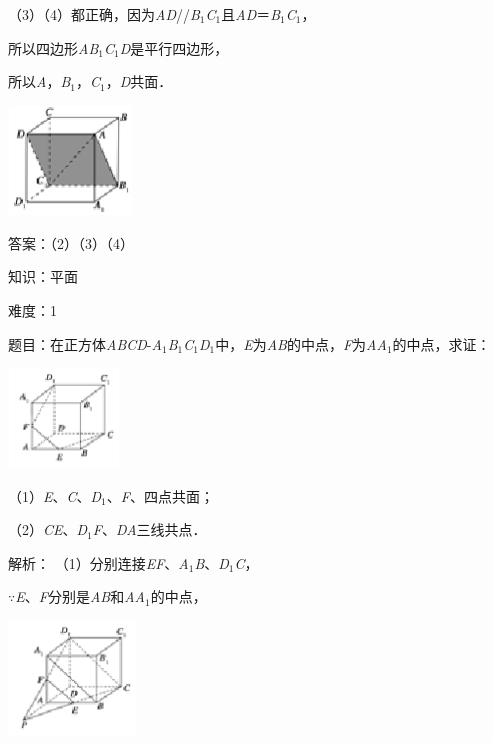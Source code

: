 \documentclass{article} %
\begin{document}
（3）（4）都正确，因为\textit{AD}//\textit{B}${}_{1}$\textit{C}${}_{1}$且\textit{AD}＝\textit{B}${}_{1}$\textit{C}${}_{1}$，

所以四边形\textit{AB}${}_{1}$\textit{C}${}_{1}$\textit{D}是平行四边形，

所以\textit{A}，\textit{B}${}_{1}$，\textit{C}${}_{1}$，\textit{D}共面．

\includegraphics*[width=1.30in, height=1.14in, keepaspectratio=false]{image90}

答案：（2）（3）（4）

知识：平面

难度：1

题目：在正方体\textit{ABCD}-\textit{A}${}_{1}$\textit{B}${}_{1}$\textit{C}${}_{1}$\textit{D}${}_{1}$中，\textit{E}为\textit{AB}的中点，\textit{F}为\textit{AA}${}_{1}$的中点，求证：



\includegraphics*[width=1.17in, height=1.04in, keepaspectratio=false]{image91}

（1）\textit{E}、\textit{C}、\textit{D}${}_{1}$、\textit{F}、四点共面；

（2）\textit{CE}、\textit{D}${}_{1}$\textit{F}、\textit{DA}三线共点．

解析：
（1）分别连接\textit{EF}、\textit{A}${}_{1}$\textit{B}、\textit{D}${}_{1}$\textit{C}，

$\mathrm{\because}$\textit{E}、\textit{F}分别是\textit{AB}和\textit{AA}${}_{1}$的中点，

\includegraphics*[width=1.33in, height=1.19in, keepaspectratio=false]{image92}
\end{document}
